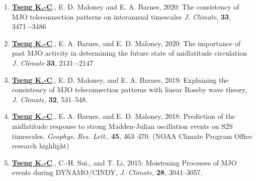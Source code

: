 \documentclass{article}
\begin{document}
\begin{enumerate}[resume]  
	\item \normalsize{\bf{\underline{Tseng K.-C}}}., E. D. Maloney and E. A. Barnes, 2020: The consistency of MJO teleconnection patterns on interannual timescales \textit{J. Climate}, \normalsize{\bf{33}}, 3471–-3486
	\item \normalsize{\bf{\underline{Tseng K.-C}}}., E. A. Barnes, and E. D. Maloney, 2020: The importance of past MJO activity in determining the future state of midlatitude circulation  \textit{J. Climate} \normalsize{\bf{33}}, 2131–-2147 \par
	\item \normalsize{\bf{\underline{Tseng K.-C}}}., E. D. Maloney, and E. A. Barnes, 2019: Explaining the consistency of MJO teleconnection patterns with linear Rossby wave theory, \textit{J. Climate}, \normalsize{\bf{32}}, 531--548.
	\item \normalsize{\bf{\underline{Tseng K.-C}}}., E. A. Barnes, and E. D. Maloney, 2018: Prediction of the midlatitude response to strong Madden-Julian oscillation events on S2S timescales, \textit{Geophys. Res. Lett}., \normalsize{\bf{45}}, 463--470. (NOAA Climate Program Office research highlight)\par
	\item \normalsize{\bf{\underline{Tseng K.-C}}}., C.-H. Sui., and T. Li, 2015: Moistening Processes of MJO events during DYNAMO/CINDY, \textit{J. Climate}, \normalsize{\bf{28}}, 3041--3057.
    \end{enumerate}
\end{document}
